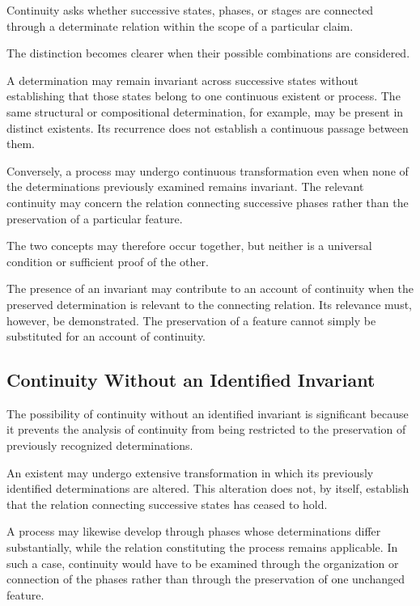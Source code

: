 Continuity asks whether successive states, phases,
or stages are connected through a determinate
relation within the scope of a particular claim.

The distinction becomes clearer when their possible
combinations are considered.



A determination may remain invariant across
successive states without establishing that those
states belong to one continuous existent or process.
The same structural or compositional determination,
for example, may be present in distinct existents.
Its recurrence does not establish a continuous
passage between them.

Conversely, a process may undergo continuous
transformation even when none of the determinations
previously examined remains invariant. The relevant
continuity may concern the relation connecting
successive phases rather than the preservation
of a particular feature.

The two concepts may therefore occur together,
but neither is a universal condition or sufficient
proof of the other.

The presence of an invariant may contribute to
an account of continuity when the preserved
determination is relevant to the connecting relation.
Its relevance must, however, be demonstrated.
The preservation of a feature cannot simply be
substituted for an account of continuity.

\subsection{Continuity Without an Identified Invariant}

The possibility of continuity without an identified
invariant is significant because it prevents the
analysis of continuity from being restricted to
the preservation of previously recognized
determinations.

An existent may undergo extensive transformation
in which its previously identified determinations
are altered. This alteration does not, by itself,
establish that the relation connecting successive
states has ceased to hold.

A process may likewise develop through phases
whose determinations differ substantially, while
the relation constituting the process remains
applicable. In such a case, continuity would have
to be examined through the organization or
connection of the phases rather than through
the preservation of one unchanged feature.

